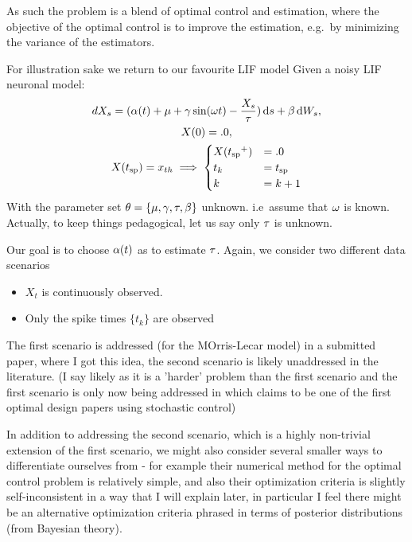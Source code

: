 As such the problem is a blend of optimal control and estimation, where the
objective of the optimal control is to improve the estimation, e.g.\ by
minimizing the variance of the estimators. 

For illustration sake we return to our favourite LIF model
Given a noisy LIF neuronal model:
\begin{equation}
\begin{gathered}
dX_s = (\alpha(t) + {\mu } + {\gamma } \sin({\omega} t) - \frac{X_s}{{ \tau }} ) \, \mathrm{d} s + \beta \, \mathrm{d} W_s,
\\
X(0) = .0,
\\
X({ t_{\textrm{sp} } }) = { x_{th} } \implies  
\begin{cases}
X({ t_{\textrm{sp} } }^+) &= .0   
\\
t_k &=  { t_{\textrm{sp} } }
\\
k  &= k+1
\end{cases}
\end{gathered}
\label{eq:X_evolution_uo}
\end{equation}
With the parameter set ${ \theta} = \{{\mu }, {\gamma }, { \tau }, \beta\}$ unknown. i.e\ assume that
${\omega}$ is known. Actually, to keep things pedagogical, let us say only ${ \tau }$ is
unknown.

Our goal is to choose $\alpha(t)$ as to estimate ${ \tau }$. Again, we consider two
different data scenarios
\begin{itemize}
  \item $X_t$ is continuously observed. 
	\item Only the spike times $\{t_k\}$ are observed
\end{itemize}
The first scenario is addressed (for the MOrris-Lecar model) in a submitted
paper, \cite{Lin} where I got this idea, the second scenario is likely
unaddressed in the literature. (I say likely as it is a 'harder' problem than
the first scenario and the first scenario is only now being addressed in 
\cite{Lin} which claims to be one of the first optimal design papers using
stochastic control)

In addition to addressing the second scenario, which is a highly non-trivial
extension of the first scenario, we might also consider several smaller ways to
differentiate ourselves from \cite{Lin} - for example their numerical method for
the optimal control problem is relatively simple, and also their optimization
criteria is slightly self-inconsistent in a way that I will explain later, in
particular I feel there might be an alternative optimization criteria phrased
in terms of posterior distributions (from Bayesian theory).



